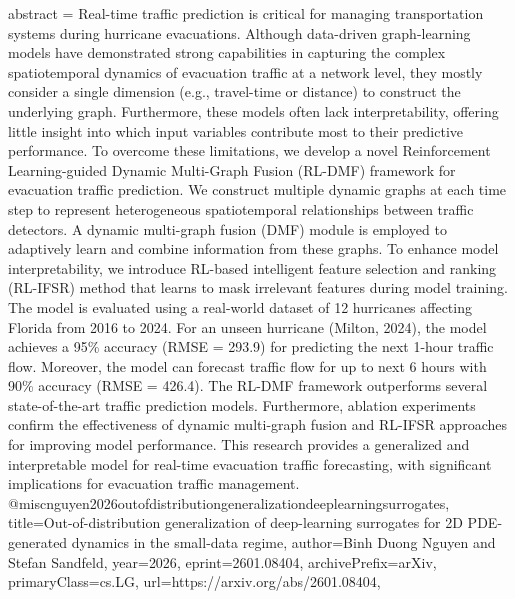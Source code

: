 {      abstract = {Real-time traffic prediction is critical for managing transportation systems during hurricane evacuations. Although data-driven graph-learning models have demonstrated strong capabilities in capturing the complex spatiotemporal dynamics of evacuation traffic at a network level, they mostly consider a single dimension (e.g., travel-time or distance) to construct the underlying graph. Furthermore, these models often lack interpretability, offering little insight into which input variables contribute most to their predictive performance. To overcome these limitations, we develop a novel Reinforcement Learning-guided Dynamic Multi-Graph Fusion (RL-DMF) framework for evacuation traffic prediction. We construct multiple dynamic graphs at each time step to represent heterogeneous spatiotemporal relationships between traffic detectors. A dynamic multi-graph fusion (DMF) module is employed to adaptively learn and combine information from these graphs. To enhance model interpretability, we introduce RL-based intelligent feature selection and ranking (RL-IFSR) method that learns to mask irrelevant features during model training. The model is evaluated using a real-world dataset of 12 hurricanes affecting Florida from 2016 to 2024. For an unseen hurricane (Milton, 2024), the model achieves a 95\% accuracy (RMSE = 293.9) for predicting the next 1-hour traffic flow. Moreover, the model can forecast traffic flow for up to next 6 hours with 90\% accuracy (RMSE = 426.4). The RL-DMF framework outperforms several state-of-the-art traffic prediction models. Furthermore, ablation experiments confirm the effectiveness of dynamic multi-graph fusion and RL-IFSR approaches for improving model performance. This research provides a generalized and interpretable model for real-time evacuation traffic forecasting, with significant implications for evacuation traffic management.}
}@misc{nguyen2026outofdistributiongeneralizationdeeplearningsurrogates,
      title={Out-of-distribution generalization of deep-learning surrogates for 2D PDE-generated dynamics in the small-data regime}, 
      author={Binh Duong Nguyen and Stefan Sandfeld},
      year={2026},
      eprint={2601.08404},
      archivePrefix={arXiv},
      primaryClass={cs.LG},
      url={https://arxiv.org/abs/2601.08404},
}
